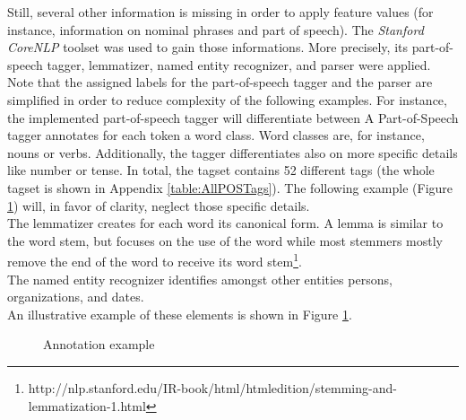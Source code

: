 Still, several other information is missing in order to apply feature values (for instance, information on nominal phrases and part of speech). The \textit{Stanford CoreNLP} toolset \citep{manning-EtAl:2014:P14-5} was used to gain those informations. More precisely, its part-of-speech tagger, lemmatizer, named entity recognizer, and parser were applied. 
Note that the assigned labels for the part-of-speech tagger and the parser are simplified in order to reduce complexity of the following examples. For instance, the implemented part-of-speech tagger will differentiate between 
A Part-of-Speech tagger annotates for each token a word class. Word classes are, for instance, nouns or verbs. Additionally, the tagger differentiates also on more specific details like number or tense. In total, the tagset contains 52 different tags (the whole tagset is shown in Appendix \ref{table:AllPOSTags}). The following example (Figure \ref{figure:nlppipelineexample}) will, in favor of clarity, neglect those specific details.\\
The lemmatizer creates for each word its canonical form. A lemma is similar to the word stem, but focuses on the use of the word while most stemmers mostly remove the end of the word to receive its word stem\footnote{http://nlp.stanford.edu/IR-book/html/htmledition/stemming-and-lemmatization-1.html}.\\
The named entity recognizer identifies amongst other entities persons, organizations, and dates. \\
An illustrative example of these elements is shown in Figure \ref{figure:nlppipelineexample}. 

\begin{figure}[h]
	\centering
	\caption{Annotation example}
	\label{figure:nlppipelineexample}
\end{figure}

